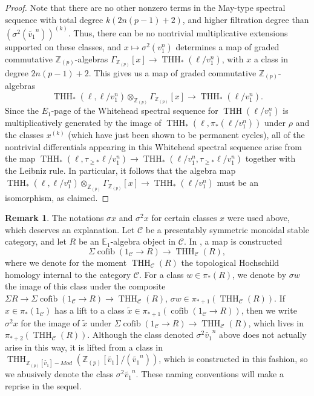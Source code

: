 \documentclass[11pt,leqno]{article}
\newcommand{\zz}{\mathbb{Z}}
\newcommand{\bb}[1]{\mathbb{#1}}
\newcommand{\mc}[1]{\mathcal{#1}}
\DeclareMathOperator{\THH}{THH}
\DeclareMathOperator{\cofib}{cofib}
\newtheorem*{short hand}{theorem name}
\theoremstyle{plain}  %
\theoremstyle{definition}
\newtheorem{remark}{Remark}[section]
\numberwithin{equation}{section}
\begin{document}
\begin{proof}
Note that there are no other nonzero terms in the May-type spectral sequence with total degree $k(2n(p-1)+2)$, and higher filtration degree than $(\sigma^2 (\tilde{v_1}^n))^{(k)}$.  Thus, there can be no nontrivial multiplicative extensions supported on these classes, and $x\mapsto \sigma^2 (v_1^n)$ determines a map of graded commutative $\zz_{(p)}$-algebras $\Gamma_{\zz_{(p)}}[x]\to \THH_*(\ell/v_1^n)$, with $x$ a class in degree $2n(p-1)+2$.  This gives us a map of graded commutative $\zz_{(p)}$-algebras 
$$\THH_*(\ell,\ell/v_1^n)\otimes_{\zz_{(p)}}\Gamma_{\zz_{(p)}}[x]\to \THH_*(\ell/v_1^n).$$
Since the $E_1$-page of the Whitehead spectral sequence for $\THH(\ell/v_1^n)$ is multiplicatively generated by the image of $\THH_*(\ell,\pi_*(\ell/v_1^n))$ under $\rho$ and the classes $x^{(k)}$ (which have just been shown to be permanent cycles), all of the nontrivial differentials appearing in this Whitehead spectral sequence arise from the map $\THH_*(\ell,\tau_{\geq *}\ell/v_1^n)\to\THH_*(\ell/v_1^n,\tau_{\geq *}\ell/v_1^n)$ together with the Leibniz rule.  In particular, it follows that the algebra map $\THH_*(\ell,\ell/v_1^n)\otimes_{\zz_{(p)}}\Gamma_{\zz_{(p)}}[x]\to \THH_*(\ell/v_1^n)$ must be an isomorphism, as claimed.
\end{proof}
\begin{remark}
The notations $\sigma x$ and $\sigma^2 x$ for certain classes $x$ were used above, which deserves an explanation.  Let $\mc{C}$ be a presentably symmetric monoidal stable category, and let $R$ be an $\bb{E}_1$-algebra object in $\mc{C}$.  In \cite[~\textsection A]{hahn2022redshift}, a map is constructed $$\Sigma\cofib(1_{\mc{C}}\to R)\to\THH_{\mc{C}}(R),$$ where we denote for the moment $\THH_{\mc{C}}(R)$ the topological Hochschild homology internal to the category $\mc{C}$.  For a class $w\in \pi_*(R)$, we denote by $\sigma w$ the image of this class under the composite $\Sigma R\to \Sigma\cofib(1_{\mc{C}}\to R)\to \THH_{\mc{C}}(R)$, $\sigma w\in \pi_{*+1}(\THH_{\mc{C}}(R))$.  If $x\in \pi_{*}(1_{\mc{C}})$ has a lift to a class $\tilde{x}\in\pi_{*+1}(\cofib(1_{\mc{C}}\to R))$, then we write $\sigma^2x$ for the image of $\tilde{x}$ under $\Sigma\cofib(1_{\mc{C}}\to R)\to\THH_{\mc{C}}(R)$, which lives in $\pi_{*+2}(\THH_{\mc{C}}(R))$.  Although the class denoted $\sigma^2\tilde{v_1}^{n}$ above does not actually arise in this way, it is lifted from a class in $\THH_{\zz_{(p)}[\tilde{v_1}]-Mod}(\zz_{(p)}[\tilde{v_1}]/(\tilde{v_1}^n))$, which is constructed in this fashion, so we abusively denote the class $\sigma^2\tilde{v_1}^n$.  These naming conventions will make a reprise in the sequel.
\end{remark}
\newpage 
\end{document}
